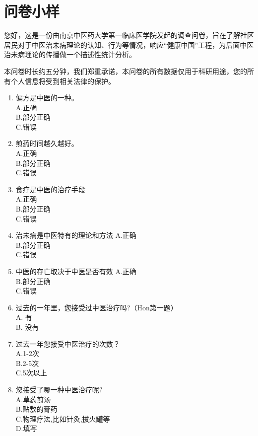 \section{问卷小样}
您好，这是一份由南京中医药大学第一临床医学院发起的调查问卷，旨在了解社区居民对于中医治未病理论的认知、行为等情况，响应“健康中国”工程，为后面中医治未病理论的传播做一个描述性统计分析。

本问卷时长约五分钟，我们郑重承诺，本问卷的所有数据仅用于科研用途，您的所有个人信息将受到相关法律的保护。

\begin{enumerate}

\item
偏方是中医的一种。\\
A.正确\\
B.部分正确\\
C.错误

\item
煎药时间越久越好。\\
A.正确\\
B.部分正确\\
C.错误

\item
食疗是中医的治疗手段\\
A.正确\\
B.部分正确\\
C.错误

\item 
治未病是中医特有的理论和方法
A.正确\\
B.部分正确\\
C.错误

\item 中医的存亡取决于中医是否有效
A.正确\\
B.部分正确\\
C.错误

\item
过去的一年里，您接受过中医治疗吗?（Hon第一题）\\
A. 有\\
B. 没有

\item
过去一年您接受中医治疗的次数？\\
A.1-2次\\
B.2-5次\\
C.5次以上

\item
您接受了哪一种中医治疗呢?\\
A.草药煎汤\\
B.贴敷的膏药\\
C.物理疗法,比如针灸,拔火罐等\\
D.填写


\end{enumerate}
